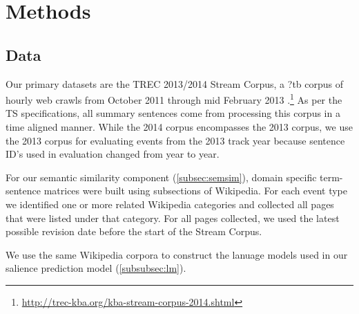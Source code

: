 
\section{Methods}
\label{sec:methods}
\subsection{Data}\label{sec:data}

Our primary datasets are the TREC 2013/2014 Stream Corpus, 
a ?tb corpus of hourly 
web crawls from October 2011
through mid February 2013 \cite{frank2012building}.\footnote{\url{http://trec-kba.org/kba-stream-corpus-2014.shtml}}
As per the TS specifications, all summary sentences come from processing this
corpus in a time aligned manner. While the 2014 corpus encompasses the 
2013 corpus, we use the 2013 corpus for evaluating events from the 2013 track
year because sentence ID's used in evaluation changed from year to year.

For our semantic similarity component (\cref{subsec:semsim}),
domain specific term-sentence matrices were built using subsections of
Wikipedia. For each event type we identified one or more related Wikipedia
categories and collected all pages that were listed under that category.
For all pages collected, we used the latest possible revision date before the
start of the Stream Corpus.

We use the same Wikipedia corpora to construct the lanuage models used
in our salience prediction model (\cref{subsubsec:lm}). 

